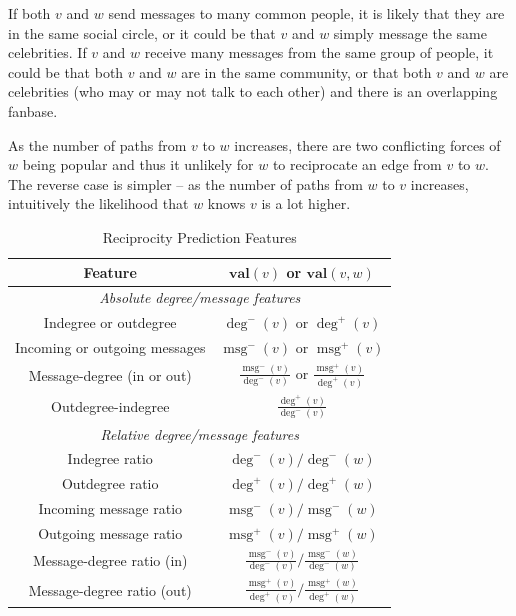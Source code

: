 \documentclass[conference]{IEEEtran}
\begin{document}
If both $v$ and $w$ send messages to many common people, it is likely that they are in the same social circle, or it could be that $v$ and $w$ simply message the same celebrities. If $v$ and $w$ receive many messages from the same group of people, it could be that both $v$ and $w$ are in the same community, or that both $v$ and $w$ are celebrities (who may or may not talk to each other) and there is an overlapping fanbase.

As the number of paths from $v$ to $w$ increases, there are two conflicting forces of $w$ being popular and thus it unlikely for $w$ to reciprocate an edge from $v$ to $w$. The reverse case is simpler -- as the number of paths from $w$ to $v$ increases, intuitively the likelihood that $w$ knows $v$ is a lot higher.

\begin{table}[!t]
\renewcommand{\arraystretch}{1.3}
\caption{Reciprocity Prediction Features}
\label{table_recmethods}
\centering
\begin{tabular}{|c||c|}
\hline
\bf{Feature} & $\mathbf{val}(v)$ or $\mathbf{val}(v,w)$\\
\hline
\multicolumn{2}{|c|}{\emph{Absolute degree/message features}} \\
\hline
Indegree or outdegree & $\deg^-(v)$ or $\deg^+(v)$ \\
Incoming or outgoing messages & $\operatorname{msg}^-(v)$ or $\operatorname{msg}^+(v)$ \\
Message-degree (in or out) & $\frac{\operatorname{msg}^-(v)}{\deg^-(v)}$ or $\frac{\operatorname{msg}^+(v)}{\deg^+(v)}$ \\
Outdegree-indegree & $\frac{\deg^+(v)}{\deg^-(v)}$ \\
\hline
\multicolumn{2}{|c|}{\emph{Relative degree/message features}} \\
\hline
Indegree ratio & $\deg^-(v) / \deg^-(w)$ \\
Outdegree ratio & $\deg^+(v) / \deg^+(w)$ \\
\hline
Incoming message ratio & $\operatorname{msg}^-(v) / \operatorname{msg}^-(w)$ \\
Outgoing message ratio & $\operatorname{msg}^+(v) / \operatorname{msg}^+(w)$ \\
\hline
Message-degree ratio (in) & $\frac{\operatorname{msg}^-(v)}{\deg^-(v)} / \frac{\operatorname{msg}^-(w)}{\deg^-(w)}$ \\
Message-degree ratio (out) & $\frac{\operatorname{msg}^+(v)}{\deg^+(v)} / \frac{\operatorname{msg}^+(w)}{\deg^+(w)}$ \\

\end{tabular}
\end{table}
\end{document}
